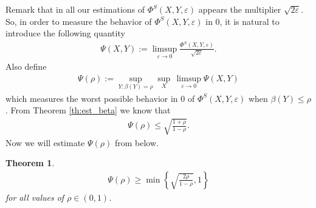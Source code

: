 \documentclass[11pt,a4paper]{amsart}
\newcommand{\eps}{\varepsilon}
\numberwithin{equation}{section}
\theoremstyle{plain}
\newtheorem{theorem}{Theorem}[section]
\theoremstyle{definition}
\renewcommand{\leq}{\leqslant}
\renewcommand{\geq}{\geqslant}
\begin{document}
Remark that in all our estimations of $\Phi^S(X,Y,\eps)$ appears the multiplier $\sqrt{2\eps}$. So, in order to measure the behavior of $\Phi^S(X,Y,\eps)$ in $0$, it is natural to introduce the following quantity
\begin{align*}
\Psi(X, Y):=\underset{\eps\rightarrow 0}{\limsup}\frac{\Phi^S(X,Y,\eps)}{\sqrt{2\eps}}.
\end{align*}
 Also  define
\begin{align*}
\Psi(\rho):=\underset{Y:\beta(Y)=\rho}{\sup}\underset{X}{\sup} \,\underset{\eps\rightarrow 0}{\limsup}\Psi(X, Y)
\end{align*}
which measures the worst possible behavior in $0$ of $\Phi^S(X,Y,\eps)$ when $\beta(Y)\leq\rho$.  From Theorem \ref{th:est_beta} we know that
\begin{align*}
\Psi(\rho)\leq \sqrt{\frac{1+\rho}{1-\rho}} .
\end{align*}
Now we will estimate  $\Psi(\rho)$  from below.
\begin{theorem}
\begin{align*}\Psi(\rho)\geq \min\left\{\sqrt{\frac{2\rho}{1-\rho}},1\right\}
\end{align*}
for all values of $\rho\in (0, 1)$.
\end{theorem}
\end{document}

